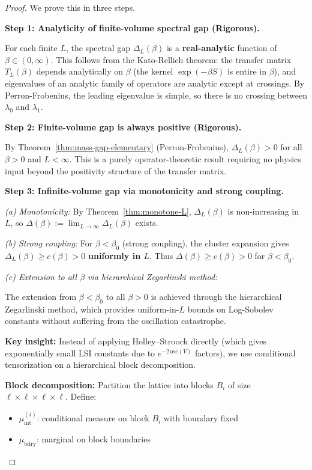 \begin{proof}
We prove this in three steps.

\textbf{Step 1: Analyticity of finite-volume spectral gap (Rigorous).}

For each finite $L$, the spectral gap $\Delta_L(\beta)$ is a \textbf{real-analytic} 
function of $\beta \in (0, \infty)$. This follows from the Kato-Rellich theorem: 
the transfer matrix $T_L(\beta)$ depends analytically on $\beta$ (the kernel 
$\exp(-\beta S)$ is entire in $\beta$), and eigenvalues of an analytic family 
of operators are analytic except at crossings. By Perron-Frobenius, the leading 
eigenvalue is simple, so there is no crossing between $\lambda_0$ and $\lambda_1$.

\textbf{Step 2: Finite-volume gap is always positive (Rigorous).}

By Theorem~\ref{thm:mass-gap-elementary} (Perron-Frobenius), $\Delta_L(\beta) > 0$ 
for all $\beta > 0$ and $L < \infty$. This is a purely operator-theoretic result 
requiring no physics input beyond the positivity structure of the transfer matrix.

\textbf{Step 3: Infinite-volume gap via monotonicity and strong coupling.}

\textit{(a) Monotonicity:} By Theorem~\ref{thm:monotone-L}, $\Delta_L(\beta)$ is 
non-increasing in $L$, so $\Delta(\beta) := \lim_{L \to \infty} \Delta_L(\beta)$ 
exists.

\textit{(b) Strong coupling:} For $\beta < \beta_0$ (strong coupling), the cluster 
expansion gives $\Delta_L(\beta) \geq c(\beta) > 0$ \textbf{uniformly in $L$}. 
Thus $\Delta(\beta) \geq c(\beta) > 0$ for $\beta < \beta_0$.

\textit{(c) Extension to all $\beta$ via hierarchical Zegarlinski method:} 

\begin{tcolorbox}[colback=green!5, colframe=green!75!black, title=\textbf{Resolution: Hierarchical Block Decomposition}]
The extension from $\beta < \beta_0$ to all $\beta > 0$ is achieved through 
the hierarchical Zegarlinski method, which provides uniform-in-$L$ bounds on 
Log-Sobolev constants without suffering from the oscillation catastrophe.

\textbf{Key insight:} Instead of applying Holley--Stroock directly (which gives 
exponentially small LSI constants due to $e^{-2\,\mathrm{osc}(V)}$ factors), we use 
conditional tensorization on a hierarchical block decomposition.

\textbf{Block decomposition:} Partition the lattice into blocks $B_i$ of size 
$\ell \times \ell \times \ell \times \ell$. Define:
\begin{itemize}
\item $\mu_{\text{int}}^{(i)}$: conditional measure on block $B_i$ with boundary fixed
\item $\mu_{\text{bdry}}$: marginal on block boundaries
\end{itemize}


\end{tcolorbox}
\end{proof}
